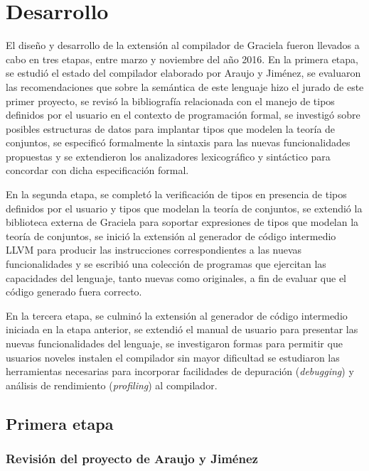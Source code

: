 \chapter{Desarrollo}
\label{capitulo3}

El diseño y desarrollo de la extensión al compilador de Graciela fueron llevados
a cabo en tres etapas, entre marzo y noviembre del año 2016. En la primera
etapa,
 se estudió el estado del compilador elaborado por Araujo y Jiménez,
 se evaluaron las recomendaciones que sobre la semántica de este lenguaje hizo el
jurado de este primer proyecto,
 se revisó la bibliografía relacionada con el manejo de tipos definidos por el
usuario en el contexto de programación formal,
 se investigó sobre posibles estructuras de datos para implantar tipos que modelen la teoría de conjuntos,
 se especificó formalmente la sintaxis para las nuevas funcionalidades propuestas
y
 se extendieron los analizadores lexicográfico y sintáctico para concordar con
dicha especificación formal.

En la segunda etapa,
 se completó la verificación de tipos en presencia de tipos definidos por el
usuario y tipos que modelan la teoría de conjuntos,
 se extendió la biblioteca
externa de Graciela para soportar expresiones de tipos que modelan la teoría de
conjuntos,
 se inició la extensión al generador de código intermedio LLVM para producir las
instrucciones correspondientes a las nuevas funcionalidades y
 se escribió una colección de programas que ejercitan las capacidades del
lenguaje, tanto nuevas como originales, a fin de evaluar que el código generado
fuera correcto.

En la tercera etapa,
 se culminó la extensión al generador de código intermedio iniciada en la etapa
anterior,
 se extendió el manual de usuario para presentar las nuevas funcionalidades del
lenguaje,
 se investigaron formas para permitir que usuarios noveles instalen el compilador
sin mayor dificultad
 se estudiaron las herramientas necesarias para incorporar facilidades de
depuración (\emph{debugging}) y análisis de rendimiento (\emph{profiling}) al
compilador.

\section{Primera etapa}
\subsection{Revisión del proyecto de Araujo y Jiménez}
\blindtext[1]

